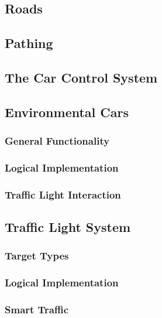 \documentclass{article}
\begin{document}
\subsection{Roads}
\lipsum[2][1]

\subsection{Pathing}
\lipsum[2][1]

\subsection{The Car Control System}
\lipsum[2][1]

\subsection{Environmental Cars}
\lipsum[2][1]

\subsubsection{General Functionality}
\lipsum[2][1]

\subsubsection{Logical Implementation}
\lipsum[2][1]

\subsubsection{Traffic Light Interaction}
\lipsum[2][1]

\subsection{Traffic Light System}
\lipsum[2][1]

\subsubsection{Target Types}
\lipsum[2][1]

\subsubsection{Logical Implementation}
\lipsum[2][1]

\subsubsection{Smart Traffic}
\lipsum[2][1]
\end{document}
